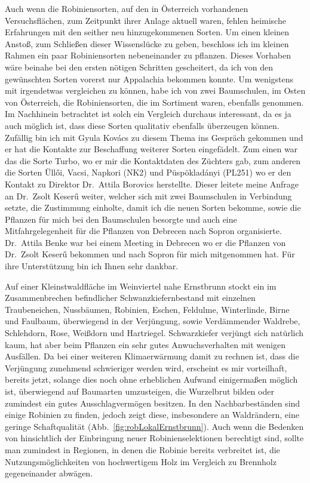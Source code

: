 \documentclass[twocolumn]{scrartcl}
\begin{document}
Auch wenn die Robiniensorten, auf den in Österreich vorhandenen Versuchsflächen,
zum Zeitpunkt ihrer Anlage aktuell waren,
fehlen heimische Erfahrungen mit den seither neu hinzugekommenen Sorten.
Um einen kleinen Anstoß, zum Schließen dieser Wissenslücke zu
geben, beschloss ich im kleinen Rahmen ein paar Robiniensorten
nebeneinander zu pflanzen. Dieses Vorhaben wäre beinahe bei den ersten
nötigen Schritten gescheitert, da ich von den gewünschten Sorten
vorerst nur Appalachia bekommen konnte. Um wenigstens mit irgendetwas
vergleichen zu können, habe ich von zwei Baumschulen, im Osten von
Österreich, die Robiniensorten, die im Sortiment waren, ebenfalls
genommen. Im Nachhinein betrachtet ist solch ein Vergleich durchaus
interessant, da es ja auch möglich ist, dass diese Sorten qualitativ
ebenfalls überzeugen können. Zufällig bin ich mit Gyula Kovács zu
diesem Thema ins Gespräch gekommen und er hat die Kontakte zur
Beschaffung weiterer Sorten eingefädelt. Zum einen war das die Sorte
Turbo, wo er mir die Kontaktdaten des Züchters gab, zum anderen die
Sorten Üllői, Vacsi, Napkori (NK2) und Püspökladányi (PL251)
wo er den
Kontakt zu Direktor Dr.~Attila Borovics herstellte. Dieser leitete
meine Anfrage an Dr.~Zsolt Keserű weiter, welcher sich mit zwei
Baumschulen in Verbindung setzte, die Zustimmung einholte, damit ich
die neuen Sorten bekomme, sowie die Pflanzen für mich bei den
Baumschulen besorgte und auch eine Mitfahrgelegenheit für die Pflanzen
von Debrecen nach Sopron organisierte. Dr.~Attila Benke war bei einem
Meeting in Debrecen wo er die Pflanzen von Dr.~Zsolt Keserű bekommen
und nach Sopron für mich mitgenommen hat.
Für ihre Unterstützung bin ich Ihnen sehr dankbar.

Auf einer Kleinstwaldfläche im Weinviertel nahe Ernstbrunn stockt ein im
Zusammenbrechen befindlicher Schwanzkiefernbestand mit einzelnen Traubeneichen,
Nussbäumen, Robinien, Eschen, Feldulme, Winterlinde, Birne und Faulbaum,
überwiegend in der Verjüngung, sowie Verdämmender Waldrebe, Schlehdorn, Rose,
Weißdorn und Hartriegel. Schwarzkiefer verjüngt sich natürlich kaum, hat aber
beim Pflanzen ein sehr gutes Anwuchsverhalten mit wenigen Ausfällen. Da bei
einer weiteren Klimaerwärmung damit zu rechnen ist, dass die Verjüngung
zunehmend schwieriger werden wird, erscheint es mir vorteilhaft, bereits jetzt,
solange dies noch ohne erheblichen Aufwand einigermaßen möglich ist, überwiegend
auf Baumarten umzusteigen, die Wurzelbrut bilden oder zumindest ein gutes
Ausschlagvermögen besitzen. In den Nachbarbeständen sind einige Robinien zu
finden, jedoch zeigt diese, insbesondere an Waldrändern, eine geringe
Schaftqualität (Abb.~\ref{fig:robLokalErnstbrunn}). Auch wenn die Bedenken von
\cite{bouteiller2019robinie} hinsichtlich der Einbringung neuer
Robinienselektionen berechtigt sind, sollte man zumindest in Regionen, in denen
die Robinie bereits verbreitet ist, die Nutzungsmöglichkeiten von hochwertigem
Holz im Vergleich zu Brennholz gegeneinander abwägen.
\end{document}
